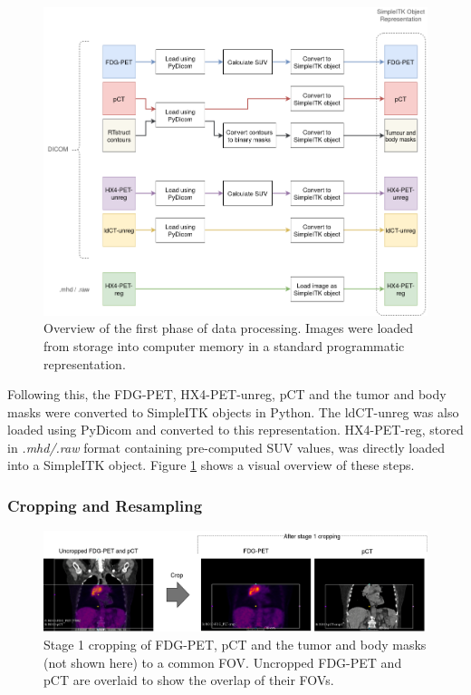 \begin{figure}[h!]
    \centering
    \includegraphics[width=0.9\linewidth]{figures/Data/data_processing_overview-step_1.png}
    \caption{Overview of the first phase of data processing. Images were loaded from storage into computer memory in a standard programmatic representation.}
    \label{fig:data_proc_overview_1}
\end{figure}

Following this, the FDG-PET, HX4-PET-unreg, pCT and the tumor and body masks were converted to SimpleITK objects in Python. The ldCT-unreg was also loaded using PyDicom and converted to this representation. HX4-PET-reg, stored in \textit{.mhd/.raw} format containing pre-computed SUV values, was directly loaded into a SimpleITK object. Figure \ref{fig:data_proc_overview_1} shows a visual overview of these steps.


\subsubsection{Cropping and Resampling}

\begin{figure}[h!]
    \centering
    \includegraphics[width=\linewidth]{figures/Data/fdgpet_pct_crop1/N010-FDG_PET_pCT-uncropped_crop1.png}
    \caption{Stage 1 cropping of FDG-PET, pCT and the tumor and body masks (not shown here) to a common FOV. Uncropped FDG-PET and pCT are overlaid to show the overlap of their FOVs.}
    \label{fig:fdg_pet_pct_crop1}
\end{figure}

